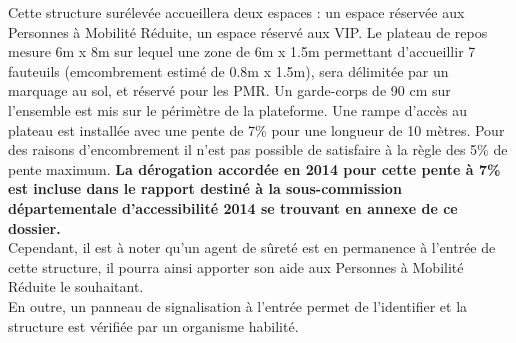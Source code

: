\documentclass[hidelinks, paper=a4, fontsize=13pt]{report}
\begin{document}
Cette structure surélevée accueillera deux espaces : un espace réservée aux Personnes à Mobilité Réduite, un espace réservé aux VIP. Le plateau de repos mesure 6m x 8m sur lequel une zone de 6m x 1.5m permettant d'accueillir 7 fauteuils (emcombrement estimé de 0.8m x 1.5m), sera délimitée par un marquage au sol, et réservé pour les PMR. Un garde-corps de 90 cm sur l’ensemble est mis sur le périmètre de la plateforme.
Une rampe d’accès au plateau est installée avec une pente de 7\% pour une longueur de 10 mètres. Pour des raisons d’encombrement il n’est pas possible de satisfaire à la règle des 5\% de pente maximum. \textbf{La dérogation accordée en 2014 pour cette pente à 7\% est incluse dans le rapport destiné à la sous-commission départementale d’accessibilité 2014 se trouvant en annexe de ce dossier.}\\

Cependant, il est à noter qu’un agent de sûreté est en permanence à l’entrée de cette structure, il pourra ainsi apporter son aide aux Personnes à Mobilité Réduite le souhaitant.\\

En outre, un panneau de signalisation à l’entrée permet de l’identifier et la structure est vérifiée par un organisme habilité.
\end{document}
